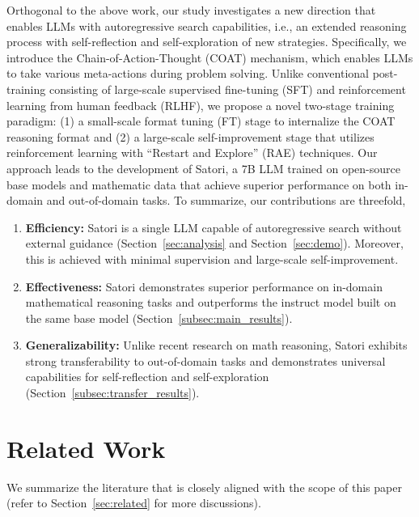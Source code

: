 Orthogonal to the above work, our study investigates a new direction that enables LLMs with autoregressive search capabilities, i.e., an extended reasoning process with self-reflection and self-exploration of new strategies. Specifically, we introduce the Chain-of-Action-Thought (COAT) mechanism, which enables LLMs to take various meta-actions during problem solving. Unlike conventional post-training consisting of large-scale supervised fine-tuning (SFT) and reinforcement learning from human feedback (RLHF), we propose a novel two-stage training paradigm: (1) a small-scale format tuning (FT) stage to internalize the COAT reasoning format and (2) a large-scale self-improvement stage that utilizes reinforcement learning with ``Restart and Explore'' (RAE) techniques. Our approach leads to the development of Satori, a 7B LLM trained on open-source base models and mathematic data that achieve superior performance on both in-domain and out-of-domain tasks. To summarize, our contributions are threefold,
\begin{enumerate}
    \item \textbf{Efficiency:} Satori is a single LLM capable of autoregressive search without external guidance (Section~\ref{sec:analysis} and Section~\ref{sec:demo}). Moreover, this is achieved with minimal supervision and large-scale self-improvement.
    \item \textbf{Effectiveness:} Satori demonstrates superior performance on in-domain mathematical reasoning tasks and outperforms the instruct model built on the same base model (Section~\ref{subsec:main_results}).
    \item \textbf{Generalizability:} Unlike recent research on math reasoning, Satori exhibits strong transferability to out-of-domain tasks and demonstrates universal capabilities for self-reflection and self-exploration (Section~\ref{subsec:transfer_results}).
\end{enumerate}


\section{Related Work}
We summarize the literature that is closely aligned with the scope of this paper (refer to Section~\ref{sec:related} for more discussions).
